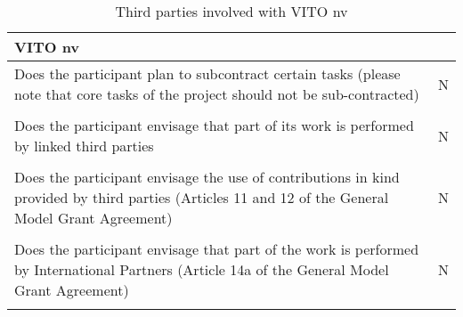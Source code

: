\begin{table}[H]
	\centering
	\begin{tabular}{|p{10cm}|p{4cm}|}
		\hline
		
		\multicolumn{2}{|p{14cm}|}{\textbf{VITO nv}}\\
		
		\hline
		
		Does the participant plan to subcontract certain tasks (please note that core tasks of the project should not be sub-contracted) & N\\
		
		\hline
		
		\multicolumn{2}{|p{14cm}|}{}\\
		
		\hline
		
		Does the participant envisage that part of its work is performed by linked third parties & N\\
		
		\hline
		
		\multicolumn{2}{|p{14cm}|}{}\\
		
		\hline
		
		Does the participant envisage the use of contributions in kind provided by third parties (Articles 11 and 12 of the General Model Grant Agreement) & N\\
		
		\hline
		
		\multicolumn{2}{|p{14cm}|}{}\\
		
		\hline
		
		Does the participant envisage that part of the work is performed by International Partners (Article 14a of the General Model Grant Agreement) & N\\
		
		\hline
		
		\multicolumn{2}{|p{14cm}|}{}\\
		
		\hline
	\end{tabular}
	\caption{Third parties involved with VITO nv}
\end{table}